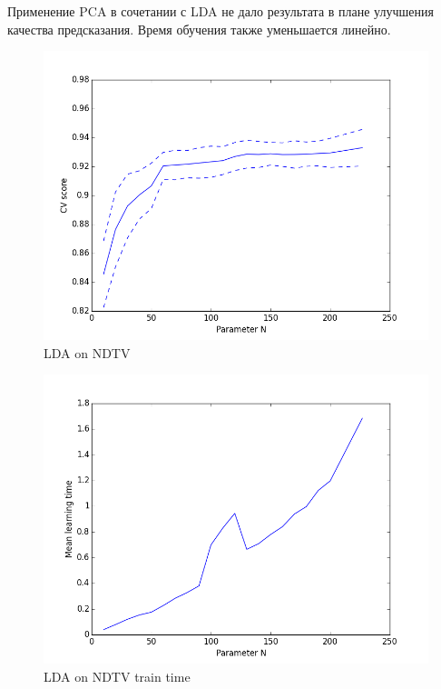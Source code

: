   Применение PCA в сочетании с LDA не дало результата в плане улучшения качества предсказания. Время обучения также уменьшается линейно.
  \begin{figure} \centering \includegraphics[width=1\textwidth]{images/LDA_NDTV_PCA.png} \caption{LDA on NDTV } \label{fig:image} \end{figure}
  \begin{figure} \centering \includegraphics[width=1\textwidth]{images/LDA_NDTV_PCA_time.png} \caption{LDA on NDTV train time} \label{fig:image} \end{figure}
  \par
  
  

